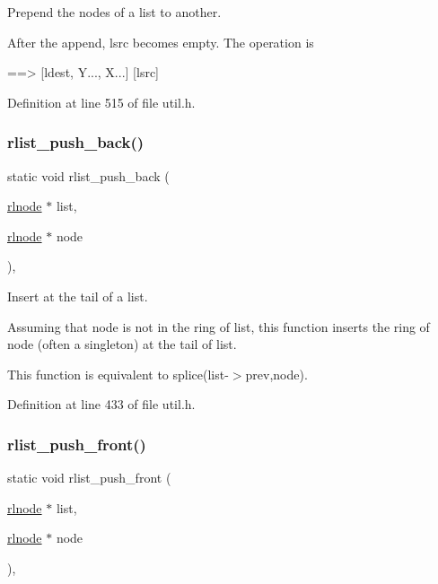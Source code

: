 Prepend the nodes of a list to another. 

After the append, {\ttfamily lsrc} becomes empty. The operation is \begin{DoxyVerb}[ldest, X...] [lsrc, Y...]  ==> [ldest, Y..., X...]  [lsrc]
\end{DoxyVerb}
 

Definition at line 515 of file util.\+h.

\mbox{\label{group__rlists_gac454004e8fb74ccd539e7fbd1affa86a}} 
\subsubsection{\texorpdfstring{rlist\+\_\+push\+\_\+back()}{rlist\_push\_back()}}
{\footnotesize\ttfamily static void rlist\+\_\+push\+\_\+back (\begin{DoxyParamCaption}\item[{\hyperlink{group__rlists_ga8f6244877f7ce2322c90525217ea6e7a}{rlnode} $\ast$}]{list,  }\item[{\hyperlink{group__rlists_ga8f6244877f7ce2322c90525217ea6e7a}{rlnode} $\ast$}]{node }\end{DoxyParamCaption})\hspace{0.3cm}{\ttfamily [inline]}, {\ttfamily [static]}}



Insert at the tail of a list. 

Assuming that {\ttfamily node} is not in the ring of {\ttfamily list}, this function inserts the ring of {\ttfamily node} (often a singleton) at the tail of {\ttfamily list}.

This function is equivalent to {\ttfamily splice}(list-\/$>$prev,node). 

Definition at line 433 of file util.\+h.

\mbox{\label{group__rlists_ga63ab59e50f2007a6bfedb0180a73b06f}} 
\subsubsection{\texorpdfstring{rlist\+\_\+push\+\_\+front()}{rlist\_push\_front()}}
{\footnotesize\ttfamily static void rlist\+\_\+push\+\_\+front (\begin{DoxyParamCaption}\item[{\hyperlink{group__rlists_ga8f6244877f7ce2322c90525217ea6e7a}{rlnode} $\ast$}]{list,  }\item[{\hyperlink{group__rlists_ga8f6244877f7ce2322c90525217ea6e7a}{rlnode} $\ast$}]{node }\end{DoxyParamCaption})\hspace{0.3cm}{\ttfamily [inline]}, {\ttfamily [static]}}



